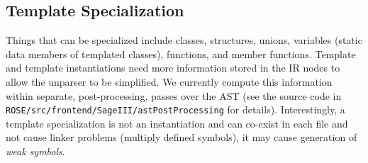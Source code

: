 
\subsection{Template Specialization}
   Things that can be specialized include classes, structures, unions,
variables (static data members of templated classes), functions, and member functions.
   Template and template instantiations need more information stored in the IR nodes to
allow the unparser to be simplified.  We currently compute this information within
separate, post-processing, passes over the AST (see the source code in
{\tt ROSE/src/frontend/SageIII/astPostProcessing} for details).
   Interestingly, a template specialization is not an instantiation and can co-exist in each
file and not cause linker problems (multiply defined symbols), it may cause generation of 
{\em weak symbols}.


